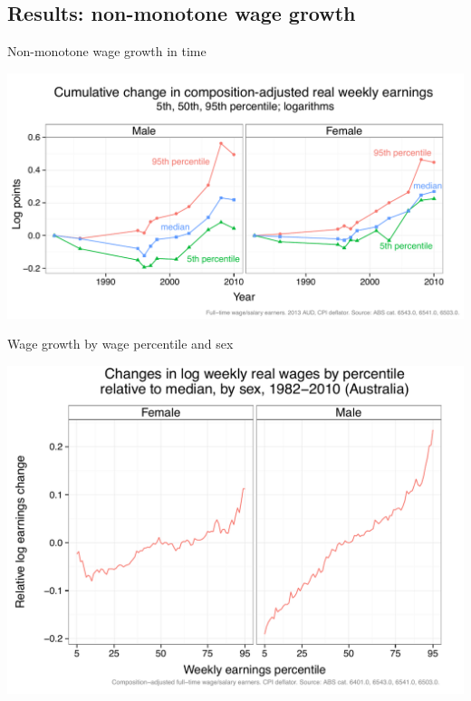 \documentclass[red]{beamer}
\begin{document}
\subsection{Results: non-monotone wage growth}
\begin{frame}{Non-monotone wage growth in time}
  \begin{center}
    \includegraphics[width=\textwidth]{slides_fig/wage_change_time.pdf}
  \end{center}
\end{frame}

\begin{frame}{Wage growth by wage percentile and sex}
  \begin{center}
    \includegraphics[width=\textwidth]{slides_fig/quantile_growth_mf.pdf}
  \end{center}
\end{frame}
\end{document}
